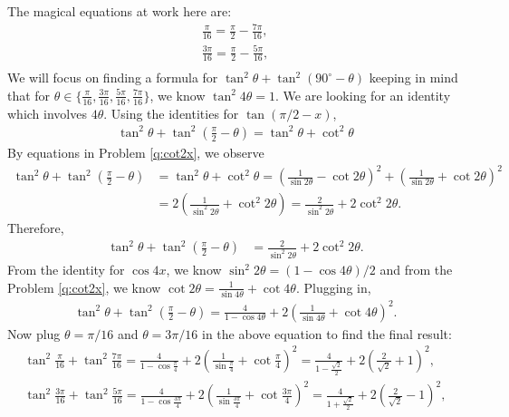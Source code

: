 \documentclass[12pt,a4paper]{memoir}
\theoremstyle{definition}
\begin{document}
\begin{solution}[name=Solution by Amir Parvardi]
	The magical equations at work here are:
	\begin{align*}
		\frac{\pi}{16} =  \frac{\pi}{2} - \frac{7\pi}{16},\\
		\frac{3\pi}{16} =  \frac{\pi}{2} - \frac{5\pi}{16},\\
	\end{align*}
	We will focus on finding a formula for $\tan^2 \theta + \tan^2 (90^\circ - \theta)$ keeping in mind that for $\theta \in \{\frac{\pi}{16}, \frac{3\pi}{16}, \frac{5\pi}{16}, \frac{7\pi}{16}\}$, we know $\tan^2 4\theta = 1$. We are looking for an identity which involves $4 \theta$. Using the identities for $\tan(\pi/2-x)$, 
	\begin{align*}
		\tan^2 \theta + \tan^2 \left(\frac{\pi}{2} - \theta\right) = \tan^2 \theta + \cot^2 \theta
	\end{align*}
	By equations in Problem \ref{q:cot2x}, we observe
	\begin{align*}
		\tan^2 \theta + \tan^2 \left(\frac{\pi}{2} - \theta\right) &= \tan^2 \theta + \cot^2 \theta = \left(\frac{1}{\sin 2\theta} - \cot 2\theta \right)^2 + \left(\frac{1}{\sin 2\theta} + \cot 2\theta \right)^2\\
		&= 2 \left( \frac{1}{\sin^2 2\theta} + \cot^2 2 \theta\right) = \frac{2}{\sin^2 2\theta} + 2 \cot^2 2\theta.
	\end{align*}
	Therefore,
	\begin{align*}
		\tan^2 \theta + \tan^2 \left(\frac{\pi}{2} - \theta\right) &= \frac{2}{\sin^2 2\theta} + 2 \cot^2 2\theta.
	\end{align*}
	From the identity for $\cos4x$, we know $\sin^2 2\theta = (1 - \cos 4 \theta)/2$ and from the Problem \ref{q:cot2x}, we know $ \cot 2\theta = \frac{1}{\sin 4\theta} + \cot 4\theta$. Plugging in,
	\begin{align*}
		\tan^2 \theta + \tan^2 \left(\frac{\pi}{2} - \theta\right) = \frac{4}{1 - \cos 4\theta} + 2 \left(\frac{1}{\sin 4\theta} + \cot 4\theta\right)^2.
	\end{align*}
	Now plug $\theta = \pi/16$ and $\theta = 3\pi/16$ in the above equation to find the final result:
	\begin{align*}
		\tan^2 \frac{\pi}{16} + \tan^2 \frac{7\pi}{16} = \frac{4}{1 - \cos \frac{\pi}{4}} + 2 \left(\frac{1}{\sin \frac{\pi}{4}} + \cot \frac{\pi}{4}\right)^2 = \frac{4}{1 - \frac{\sqrt 2}{2}} + 2 \left(\frac{2}{\sqrt 2} + 1\right)^2,\\
		\tan^2 \frac{3\pi}{16} + \tan^2 \frac{5\pi}{16} = \frac{4}{1 - \cos \frac{3\pi}{4}} + 2 \left(\frac{1}{\sin \frac{3\pi}{4}} + \cot \frac{3\pi}{4}\right)^2 = \frac{4}{1 + \frac{\sqrt 2}{2}} + 2 \left(\frac{2}{\sqrt 2} - 1\right)^2,\\

\end{align*}
\end{solution}
\end{document}
